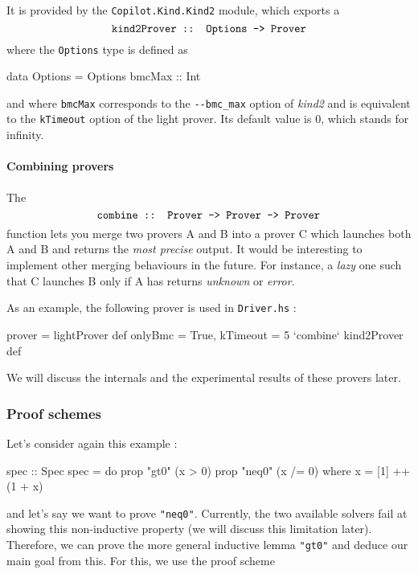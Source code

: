 It is provided by the \texttt{Copilot.Kind.Kind2} module, which exports
a $$\texttt{kind2Prover :: Options -\textgreater{} Prover}$$ where the
\texttt{Options} type is defined as

\begin{code}
data Options = Options { bmcMax :: Int }
\end{code}

and where \texttt{bmcMax} corresponds to the \texttt{-\/-bmc\_max}
option of \emph{kind2} and is equivalent to the \texttt{kTimeout} option
of the light prover. Its default value is 0, which stands for infinity.

\paragraph{Combining provers}\label{combining-provers}

The
$$\texttt{combine :: Prover -\textgreater{} Prover -\textgreater{} Prover}$$
function lets you merge two provers A and B into a prover C which
launches both A and B and returns the \emph{most precise} output. It
would be interesting to implement other merging behaviours in the
future. For instance, a \emph{lazy} one such that C launches B only if A
has returns \emph{unknown} or \emph{error}.

As an example, the following prover is used in \texttt{Driver.hs} :

\begin{code}
prover =
  lightProver def {onlyBmc = True, kTimeout = 5} 
  `combine` kind2Prover def
\end{code}

We will discuss the internals and the experimental results of these
provers later.

\subsubsection{Proof schemes}\label{proof-schemes}

Let's consider again this example :

\begin{code}
spec :: Spec
spec = do
  prop "gt0"  (x > 0)
  prop "neq0" (x /= 0)
  where
    x = [1] ++ (1 + x)

\end{code}
and let's say we want to prove \texttt{"neq0"}. Currently, the two
available solvers fail at showing this non-inductive property (we will
discuss this limitation later). Therefore, we can prove the more general
inductive lemma \texttt{"gt0"} and deduce our main goal from this. For
this, we use the proof scheme


